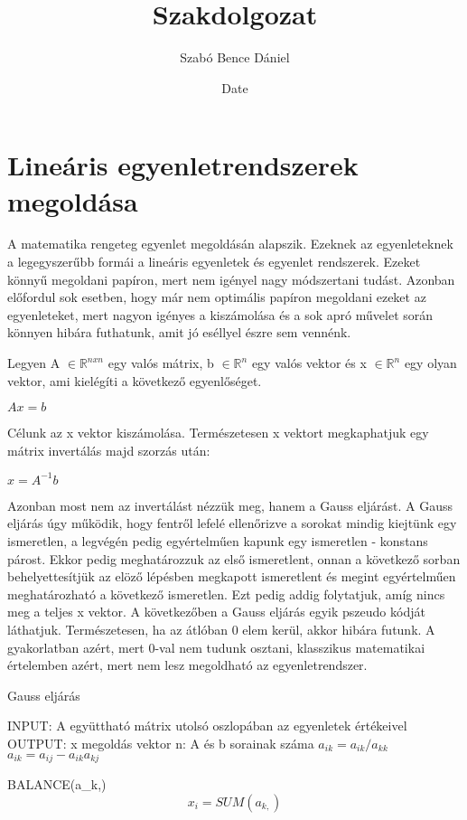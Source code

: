 \documentclass{article}
\title{Szakdolgozat}
\author{Szabó Bence Dániel }
\date{Date}
\theoremstyle{definition}
\begin{document}
\maketitle

\section{Lineáris egyenletrendszerek megoldása}


A matematika rengeteg egyenlet megoldásán alapszik. Ezeknek az egyenleteknek a legegyszerűbb formái a lineáris egyenletek és egyenlet rendszerek. Ezeket könnyű megoldani papíron, mert nem igényel nagy módszertani tudást. Azonban előfordul sok esetben, hogy már nem optimális papíron megoldani ezeket az egyenleteket, mert nagyon igényes a kiszámolása és a sok apró művelet során könnyen hibára futhatunk, amit jó eséllyel észre sem vennénk. 

Legyen A $\in \mathbb{R}^{n x n}$ egy valós mátrix, b $\in \mathbb{R}^{n}$ egy valós vektor és x $\in \mathbb{R}^{n}$ egy olyan vektor, ami kielégíti a következő egyenlőséget.
\begin{center}
    $Ax = b$
\end{center}
Célunk az x vektor kiszámolása. Természetesen x vektort megkaphatjuk egy mátrix invertálás majd szorzás után:
\begin{center}
    $x = A ^{-1}b$
\end{center}
Azonban most nem az invertálást nézzük meg, hanem a Gauss eljárást. A Gauss eljárás úgy működik, hogy fentről lefelé ellenőrizve a sorokat mindig kiejtünk egy ismeretlen, a legvégén pedig egyértelműen kapunk egy ismeretlen - konstans párost. Ekkor pedig meghatározzuk az első ismeretlent, onnan a következő sorban behelyettesítjük az elöző lépésben megkapott ismeretlent és megint egyértelműen meghatározható a következő ismeretlen. Ezt pedig addig folytatjuk, amíg nincs meg a teljes x vektor. A következőben a Gauss eljárás egyik pszeudo kódját láthatjuk. Természetesen, ha az átlóban 0 elem kerül, akkor hibára futunk. A gyakorlatban azért, mert 0-val nem tudunk osztani, klasszikus matematikai értelemben azért, mert nem lesz megoldható az egyenletrendszer.

\begin{algorithm}
\caption{Gauss eljárás}
\begin{algorithmic}
\STATE INPUT: A együttható mátrix utolsó oszlopában az egyenletek értékeivel
\STATE OUTPUT: x megoldás vektor
\STATE n: A és b sorainak száma
\STATE $a_{ik} = a_{ik} / a_{kk}$
\STATE $a_{ik} = a_{ij} - a_{ik} a_{kj}$
\ENDFOR 
\ENDFOR 
\ENDFOR 

BALANCE(a_{k,})
\newline
$$x_i = SUM(a_{k,})$$
\ENDFOR
\end{algorithmic}


\end{algorithm}
\newpage
\end{document}
